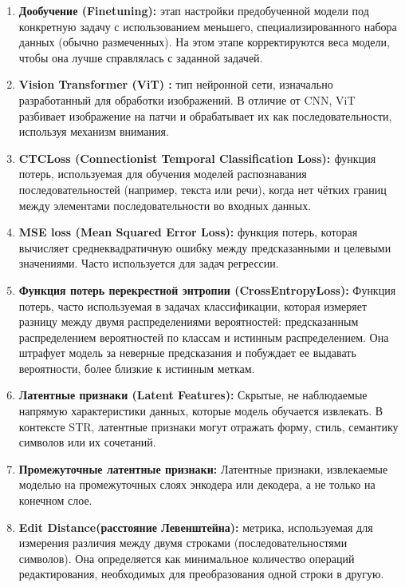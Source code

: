 \begin{enumerate}
    \item  \textbf{Дообучение (Finetuning):}  этап  настройки  предобученной  модели  под  конкретную задачу с использованием  меньшего, специализированного набора данных (обычно размеченных). На этом этапе  корректируются  веса модели,  чтобы  она  лучше  справлялась  с  заданной  задачей. 

    \item  \textbf{ Vision Transformer (ViT) \cite{dosovitskiy2020image}:} тип  нейронной  сети,  изначально  разработанный  для  обработки  изображений.  В  отличие  от  CNN, ViT  разбивает  изображение  на  патчи  и  обрабатывает  их  как  последовательности, используя  механизм  внимания.  

    \item  \textbf{ CTCLoss (Connectionist Temporal Classification Loss): \cite{graves2006connectionist}} функция  потерь,  используемая  для  обучения  моделей  распознавания  последовательностей  (например,  текста  или  речи),  когда  нет  чётких  границ  между  элементами  последовательности  во  входных  данных. 

    \item  \textbf{ MSE loss (Mean Squared Error Loss):} функция потерь, которая вычисляет среднеквадратичную ошибку между предсказанными и целевыми значениями. Часто используется для задач регрессии.

    \item \textbf{Функция потерь перекрестной энтропии (CrossEntropyLoss):} Функция потерь, часто используемая в задачах классификации, которая измеряет разницу между двумя распределениями вероятностей: предсказанным распределением вероятностей по классам и истинным распределением. Она штрафует модель за неверные предсказания и побуждает ее выдавать вероятности, более близкие к истинным меткам.

    \item  \textbf{Латентные признаки (Latent Features):} Скрытые, не наблюдаемые напрямую характеристики данных, которые модель обучается извлекать.  В контексте STR,  латентные  признаки могут  отражать форму,  стиль,  семантику  символов или их сочетаний. 

    \item  \textbf{Промежуточные латентные признаки:} Латентные признаки,  извлекаемые  моделью на промежуточных слоях энкодера или декодера, а не только на конечном слое.   

    \item  \textbf{Edit Distance(расстояние Левенштейна):}  метрика, используемая для измерения различия между двумя строками (последовательностями символов). Она определяется как минимальное количество операций редактирования, необходимых для преобразования одной строки в другую.


\end{enumerate}
